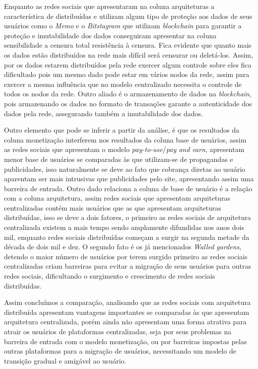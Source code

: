 Enquanto as redes sociais que apresentaram na coluna arquiteturas a característica de  distribuídas e utilizam algum tipo de proteção aos dados de seus usuários como o \textit{Memo} e o \textit{Bitstagram} que utilizam \textit{blockchain} para garantir a proteção e imutabilidade dos dados conseguiram apresentar na coluna sensibilidade a censura total resistência à censura. Fica evidente que quanto mais os dados estão distribuídos na rede mais difícil será  censurar ou deletá-los. Assim, por os dados estarem distribuídos pela rede exercer algum controle sobre eles fica dificultado pois um mesmo dado pode estar em vários nodos da rede, assim para exercer a mesma influência que no modelo centralizado necessita o controle de todos os nodos da rede. Outro aliado é o armazenamento de dados na \textit{blockchain}, pois armazenando os dados no formato de transações garante a autenticidade dos dados pela rede, assegurando também a imutabilidade dos dados.

Outro elemento que pode se inferir a partir da análise, é que os resultados  da coluna monetização interferem nos resultados da coluna base de usuários, assim as redes sociais que apresentam o modelo \textit{pay-to-use}/\textit{pay and earn}, apresentam menor base de usuários se comparadas às que utilizam-se de propagandas e publicidades, isso naturalmente se deve ao fato que cobrança diretas ao usuário aparentam ser mais intrusivas que publicidades pelo site, apresentando assim uma barreira de entrada. Outro dado relaciona a coluna de base de usuário é a relação com a coluna arquitetura, assim redes sociais que apresentam arquiteturas centralizadas contém mais usuários que as que apresentam arquiteturas distribuídas, isso se deve a dois fatores, o primeiro as redes sociais de arquitetura centralizada existem a mais tempo sendo amplamente difundidas nos anos dois mil, enquanto redes sociais distribuídas começam a surgir na segunda metade da década de dois mil e dez. O segundo fato é os já mencionados \textit{Walled gardens}, detendo o maior número de usuários por terem surgido primeiro as redes sociais centralizadas criam barreiras para evitar a migração de seus usuários para outras redes sociais, dificultando o surgimento e crescimento de redes sociais distribuídas.

Assim concluímos a comparação, analisando que as redes sociais com arquitetura distribuída apresentam vantagens importantes se comparadas às que apresentam arquitetura centralizada, porém ainda não apresentam uma forma atrativa para atrair os usuários de plataformas centralizadas, seja por seus problemas na barreira de entrada com o modelo monetização, ou por barreiras impostas pelas outras plataformas para a migração de usuários, necessitando um modelo de transição gradual e amigável ao usuário.



